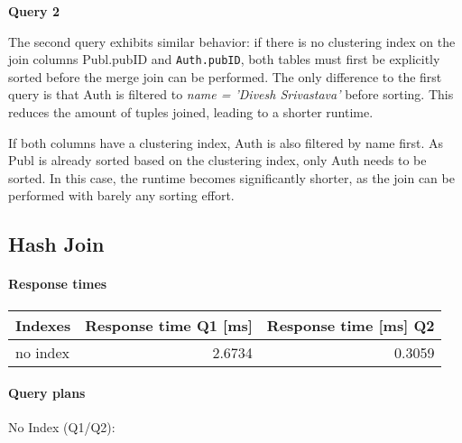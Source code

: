 \documentclass[11pt]{scrartcl}
\begin{document}
\textbf{Query 2}

The second query exhibits similar behavior: if there is no clustering
index on the join columns Publ.pubID and \texttt{Auth.pubID}, both
tables must first be explicitly sorted before the merge join can be
performed.  The only difference to the first query is that Auth is
filtered to \textit{name = 'Divesh Srivastava'} before sorting.  This
reduces the amount of tuples joined, leading to a shorter runtime.

If both columns have a clustering index, Auth is also filtered by name
first.  As Publ is already sorted based on the clustering index, only
Auth needs to be sorted.  In this case, the runtime becomes
significantly shorter, as the join can be performed with barely any
sorting effort.

\subsection*{Hash Join}

\paragraph{Response times}\mbox{}

\begin{table}[H]
  \centering
  \begin{tabular}{l|r|r}
    Indexes & Response time Q1 [ms] & Response time [ms] Q2 \tabularnewline
    \hline
    no index & 2.6734 & 0.3059 \tabularnewline
  \end{tabular}
\end{table}

\paragraph{Query plans}\mbox{}

No Index (Q1/Q2):
\end{document}
